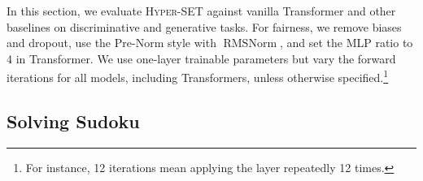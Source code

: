 In this section, we evaluate \textsc{Hyper-SET} against vanilla Transformer and other baselines on discriminative and generative tasks. For fairness, we remove biases and dropout, use the Pre-Norm style with $\operatorname{RMSNorm}$, and set the MLP ratio to 4 in Transformer. We use one-layer trainable parameters but vary the forward iterations for all models, including Transformers, unless otherwise specified.\footnote{For instance, 12 iterations mean applying the layer repeatedly 12 times.}


\subsection{Solving Sudoku} 


